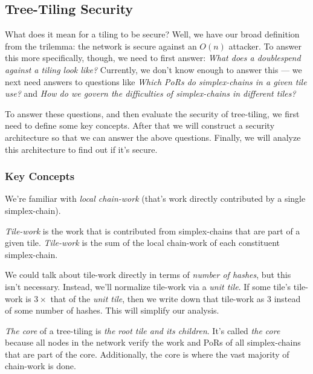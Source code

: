 \subsection{Tree-Tiling Security}

\label{sec:tiling-security}

What does it mean for a tiling to be secure?
Well, we have our broad definition from the trilemma: the network is secure against an $O(n)$ attacker.
To answer this more specifically, though, we need to first answer: \emph{What does a doublespend against a tiling look like?}
Currently, we don't know enough to answer this --- we next need answers to questions like \emph{Which PoRs do simplex-chains in a given tile use?} and \emph{How do we govern the difficulties of simplex-chains in different tiles?}

To answer these questions, and then evaluate the security of tree-tiling, we first need to define some key concepts.
After that we will construct a security architecture so that we can answer the above questions.
Finally, we will analyze this architecture to find out if it's secure.

\subsubsection{Key Concepts}


We're familiar with \emph{local chain-work} (that's work directly contributed by a single simplex-chain).

\emph{Tile-work} is the work that is contributed from simplex-chains that are part of a given tile.
\emph{Tile-work} is the sum of the local chain-work of each constituent simplex-chain.

We could talk about tile-work directly in terms of \emph{number of hashes}, but this isn't necessary.
Instead, we'll normalize tile-work via a \emph{unit tile}.
If some tile's tile-work is $3\times$ that of the \emph{unit tile}, then we write down that tile-work as $3$ instead of some number of hashes.
This will simplify our analysis.


\emph{The core} of a tree-tiling is \emph{the root tile and its children}.
It's called \emph{the core} because all nodes in the network verify the work and PoRs of all simplex-chains that are part of the core.
Additionally, the core is where the vast majority of chain-work is done.

